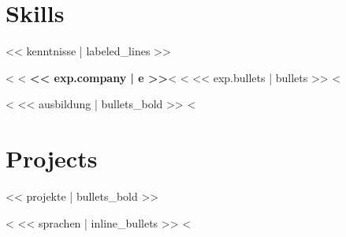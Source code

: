 \documentclass[10pt,a4paper]{article}
\begin{document}
\section*{Skills}
{\small << kenntnisse | labeled_lines >>}

<%
<%
{\bfseries << exp.company | e >>}<%
<%
\vspace{2pt}
<< exp.bullets | bullets >>
\vspace{2pt}
<%

<%
<< ausbildung | bullets_bold >>
<%

\section*{Projects}
<< projekte | bullets_bold >>

<%
<< sprachen | inline_bullets >>
<%
\end{document}
